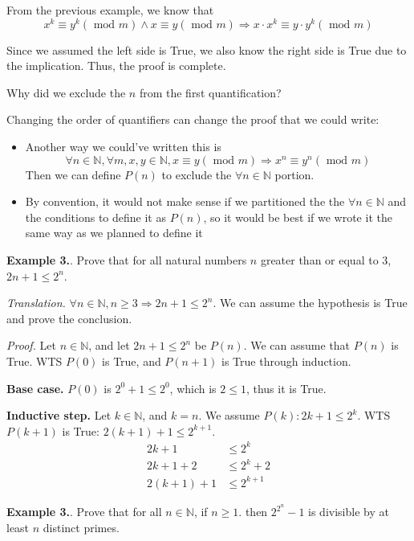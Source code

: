 \documentclass{article}
\newcounter{excount}
\newcommand\ex{\stepcounter{excount} \textbf{Example 3.\theexcount}. }
\begin{document}
From the previous example, we know that
$$x^k \equiv y^k (\text{ mod } m) \land x \equiv y (\text{ mod } m) 
\Rightarrow x \cdot x^k \equiv y \cdot y^k (\text{ mod } m)$$

Since we assumed the left side is True, we also know the right side 
is True due to the implication. Thus, the proof is complete.

Why did we exclude the $n$ from the first quantification? 

Changing the order of quantifiers can change the proof that we could write: 
\begin{itemize}
    \item Another way we could've written this is 
        $$\forall n \in \mathbb{N}, \forall m, x, y \in \mathbb{N}, 
        x \equiv y (\text{ mod } m) \Rightarrow x^n \equiv y^n (\text{ mod } m)$$
        Then we can define $P(n)$ to exclude the $\forall n \in \mathbb{N}$ 
        portion. 
    \item By convention, it would not make sense if we partitioned the 
        the $\forall n \in \mathbb{N}$ and the conditions to define it 
        as $P (n)$, so it would be best if we wrote it the same way as 
        we planned to define it 
\end{itemize}

\ex Prove that for all natural numbers $n$ greater than or equal to 3, 
$2n + 1 \leq 2^n$.

\textit{Translation.} $\forall n \in \mathbb{N}, n \geq 3 \Rightarrow 2n + 1 
\leq 2^n$. We can assume the hypothesis is True and prove the conclusion.

\textit{Proof.} Let $n \in \mathbb{N}$, and let $2n + 1 \leq 2^n$ 
be $P(n)$. We can assume that $P(n)$ is True. WTS $P(0)$ is True, 
and $P(n+1)$ is True through induction.

\textbf{Base case.} $P(0)$ is $2^0 + 1 \leq 2^0$, which is $2 \leq 1$, 
thus it is True.

\textbf{Inductive step.} Let $k \in \mathbb{N}$, and $k = n$. We assume 
$P(k): 2k + 1 \leq 2^k$. WTS $P(k+1)$ is True: $2(k+1) + 1 \leq 2^{k+1}$. 
\begin{align*}
    2k + 1 &\leq 2^{k} \\
    2k + 1 + 2 &\leq 2^k + 2\\
    2(k+1) + 1 &\leq 2^{k+1}
\end{align*}

\ex Prove that for all $n \in \mathbb{N}$, if $n \geq 1$. then $2^{2^n}-1$ 
is divisible by at least $n$ distinct primes.
\end{document}
